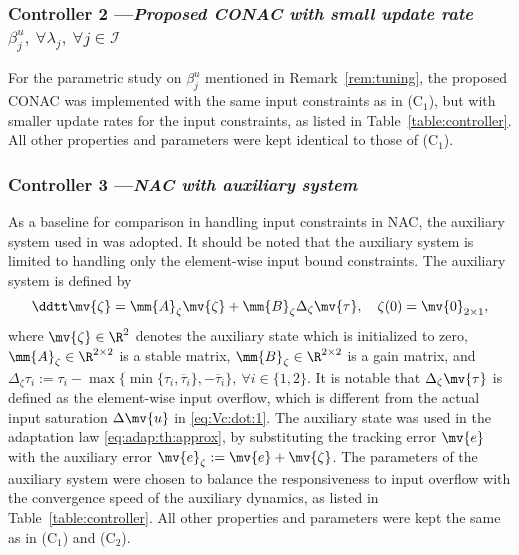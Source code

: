 \documentclass[letterpaper, journal]{IEEEtran}
\begin{document}
\subsubsection*{Controller 2 —\textit{Proposed CONAC with small update rate $\beta^u_j,\ \forall\lambda_j,\ \forall j\in\mathcal{I}$}}

For the parametric study on $\beta_j^u$ mentioned in Remark~\ref{rem:tuning}, the proposed CONAC was implemented with the same input constraints as in (C$_1$), but with smaller update rates for the input constraints, as listed in Table~\ref{table:controller}.
All other properties and parameters were kept identical to those of (C$_1$).

\subsubsection*{Controller 3 —\textit{NAC with auxiliary system}}

As a baseline for comparison in handling input constraints in NAC, the auxiliary system used in \cite{Rezaei:2025aa,Liu:2025aa,Yu:2022aa} was adopted.
It should be noted that the auxiliary system is limited to handling only the element-wise input bound constraints.
The auxiliary system is defined by 
\begin{equation}
  \ddtt \mv{\zeta} 
  =
  \mm{A}_{\zeta}
  \mv{\zeta}
  +
  \mm{B}_{\zeta}
  \Delta_{\zeta} \mv{\tau}
  ,
  \quad
  \zeta(0) 
  = 
  \mv{0}_{2\times 1}
  ,
\end{equation}
where $\mv{\zeta}\in\R^2$ denotes the auxiliary state which is initialized to zero, $\mm{A}_{\zeta}\in\R^{2\times 2}$ is a stable matrix, $\mm{B}_{\zeta}\in\R^{2\times 2}$ is a gain matrix, and $\Delta_{\zeta} \tau_i := \tau_i - \max\{\min\{\tau_i, \overline{\tau}_i\}, -\overline{\tau}_i\},\ \forall i\in\{1,2\}$.
It is notable that $\Delta_{\zeta}\mv{\tau}$ is defined as the element-wise input overflow, which is different from the actual input saturation $\Delta\mv{u}$ in \eqref{eq:Vc:dot:1}.
The auxiliary state was used in the adaptation law \eqref{eq:adap:th:approx}, by substituting the tracking error $\mv{e}$ with the auxiliary error $\mv{e}_\zeta := \mv{e} + \mv{\zeta}$.
The parameters of the auxiliary system were chosen to balance the responsiveness to input overflow with the convergence speed of the auxiliary dynamics, as listed in Table~\ref{table:controller}.
All other properties and parameters were kept the same as in (C$_1$) and (C$_2$).
\end{document}
